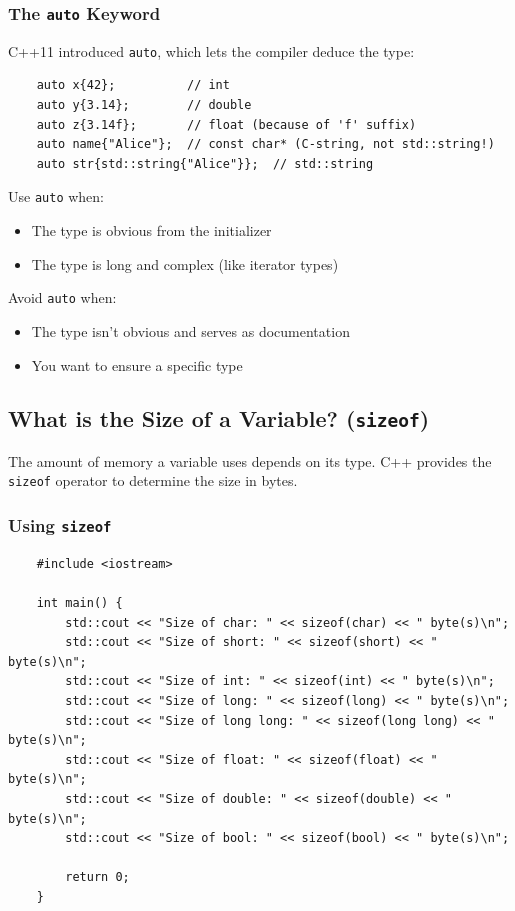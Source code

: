 \subsubsection{The \texttt{auto} Keyword}

C++11 introduced \texttt{auto}, which lets the compiler deduce the type:

\begin{lstlisting}
	auto x{42};          // int
	auto y{3.14};        // double
	auto z{3.14f};       // float (because of 'f' suffix)
	auto name{"Alice"};  // const char* (C-string, not std::string!)
	auto str{std::string{"Alice"}};  // std::string
\end{lstlisting}

\begin{remark}
	Use \texttt{auto} when:
	\begin{itemize}
		\item The type is obvious from the initializer
		\item The type is long and complex (like iterator types)
	\end{itemize}
	
	Avoid \texttt{auto} when:
	\begin{itemize}
		\item The type isn't obvious and serves as documentation
		\item You want to ensure a specific type
	\end{itemize}
\end{remark}

\subsection{What is the Size of a Variable? (\texttt{sizeof})}

The amount of memory a variable uses depends on its type. C++ provides the \texttt{sizeof} operator to determine the size in bytes.

\subsubsection{Using \texttt{sizeof}}

\begin{lstlisting}
	#include <iostream>
	
	int main() {
		std::cout << "Size of char: " << sizeof(char) << " byte(s)\n";
		std::cout << "Size of short: " << sizeof(short) << " byte(s)\n";
		std::cout << "Size of int: " << sizeof(int) << " byte(s)\n";
		std::cout << "Size of long: " << sizeof(long) << " byte(s)\n";
		std::cout << "Size of long long: " << sizeof(long long) << " byte(s)\n";
		std::cout << "Size of float: " << sizeof(float) << " byte(s)\n";
		std::cout << "Size of double: " << sizeof(double) << " byte(s)\n";
		std::cout << "Size of bool: " << sizeof(bool) << " byte(s)\n";
		
		return 0;
	}
\end{lstlisting}

